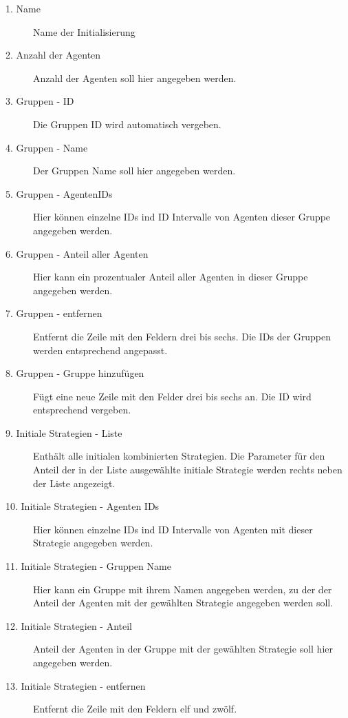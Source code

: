 \begin{description}

\item[1. Name] Name der Initialisierung

\item[2. Anzahl der Agenten] Anzahl der Agenten soll hier angegeben werden.

\item[3. Gruppen - ID] Die Gruppen ID wird automatisch vergeben.

\item[4. Gruppen - Name] Der Gruppen Name soll hier angegeben werden.

\item[5. Gruppen - AgentenIDs] Hier können einzelne IDs ind ID Intervalle von Agenten dieser Gruppe angegeben werden. 

\item[6. Gruppen - Anteil aller Agenten] Hier kann ein prozentualer Anteil aller Agenten in dieser Gruppe angegeben werden.

\item[7. Gruppen - entfernen] Entfernt die Zeile mit den Feldern drei bis sechs. Die IDs der Gruppen werden entsprechend angepasst. 

\item[8. Gruppen - Gruppe hinzufügen] Fügt eine neue Zeile mit den Felder drei bis sechs an. Die ID wird entsprechend vergeben.

\item[9. Initiale Strategien - Liste] Enthält alle initialen kombinierten Strategien. Die Parameter für den Anteil der in der Liste ausgewählte initiale Strategie werden rechts neben der Liste angezeigt. 

\item[10. Initiale Strategien - Agenten IDs] Hier können einzelne IDs ind ID Intervalle von Agenten mit dieser Strategie angegeben werden. 

\item[11. Initiale Strategien - Gruppen Name] Hier kann ein Gruppe mit ihrem Namen angegeben werden, zu der der Anteil der Agenten mit der gewählten Strategie angegeben werden soll.

\item[12. Initiale Strategien - Anteil] Anteil der Agenten in der Gruppe mit der gewählten Strategie soll hier angegeben werden.

\item[13. Initiale Strategien - entfernen] Entfernt die Zeile mit den Feldern elf und zwölf.


\end{description}
